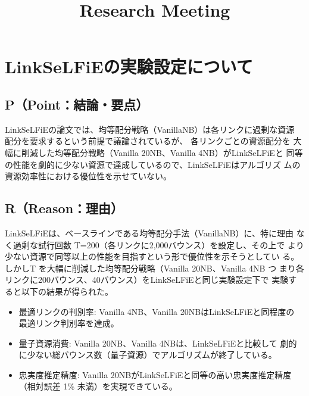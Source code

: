\documentclass[conference]{IEEEtran}
\begin{document}
\title{Research Meeting}

\author{
}

\maketitle


\section{LinkSeLFiEの実験設定について}
\label{sec:org0871e40}
\subsection{P（Point：結論・要点）}
\label{sec:org4c808ab}
LinkSeLFiEの論文では、均等配分戦略（VanillaNB）は各リンクに過剰な資源
配分を要求するという前提で議論されているが、 各リンクごとの資源配分を
大幅に削減した均等配分戦略（Vanilla 20NB、Vanilla 4NB）がLinkSeLFiEと
同等の性能を劇的に少ない資源で達成しているので、LinkSeLFiEはアルゴリズ
ムの資源効率性における優位性を示せていない。

\subsection{R（Reason：理由）}
\label{sec:org4fe3e47}
LinkSeLFiEは、ベースラインである均等配分手法（VanillaNB）に、特に理由
なく過剰な試行回数 T=200（各リンクに2,000バウンス）を設定し、その上で
より少ない資源で同等以上の性能を目指すという形で優位性を示そうとしてい
る。しかしT を大幅に削減した均等配分戦略（Vanilla 20NB、Vanilla 4NB つ
まり各リンクに200バウンス、40バウンス）をLinkSeLFiEと同じ実験設定下で
実験すると以下の結果が得られた。

\begin{itemize}
\item 最適リンクの判別率: Vanilla 4NB、Vanilla 20NBはLinkSeLFiEと同程度の
最適リンク判別率を達成。

\item 量子資源消費: Vanilla 20NB、Vanilla 4NBは、LinkSeLFiEと比較して
劇的に少ない総バウンス数（量子資源）でアルゴリズムが終了している。

\item 忠実度推定精度: Vanilla 20NBがLinkSeLFiEと同等の高い忠実度推定精度
（相対誤差 1\% 未満）を実現できている。
\end{itemize}
\end{document}
